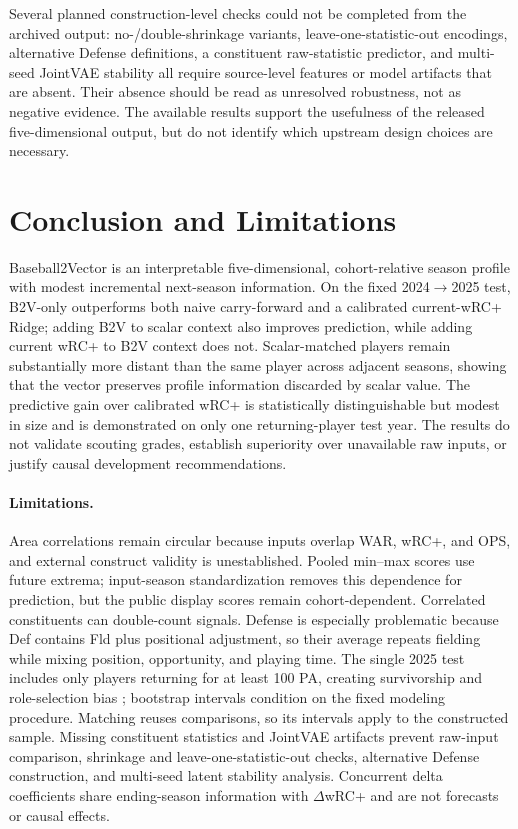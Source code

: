\documentclass[10pt,twocolumn,letterpaper]{article}
\begin{document}
Several planned construction-level checks could not be completed from the archived output: no-/double-shrinkage variants, leave-one-statistic-out encodings, alternative Defense definitions, a constituent raw-statistic predictor, and multi-seed JointVAE stability all require source-level features or model artifacts that are absent. Their absence should be read as unresolved robustness, not as negative evidence. The available results support the usefulness of the released five-dimensional output, but do not identify which upstream design choices are necessary.


\section{Conclusion and Limitations}
\label{sec:conclusion}

Baseball2Vector is an interpretable five-dimensional, cohort-relative season profile with modest incremental next-season information. On the fixed 2024$\to$2025 test, B2V-only outperforms both naive carry-forward and a calibrated current-wRC+ Ridge; adding B2V to scalar context also improves prediction, while adding current wRC+ to B2V context does not. Scalar-matched players remain substantially more distant than the same player across adjacent seasons, showing that the vector preserves profile information discarded by scalar value. The predictive gain over calibrated wRC+ is statistically distinguishable but modest in size and is demonstrated on only one returning-player test year. The results do not validate scouting grades, establish superiority over unavailable raw inputs, or justify causal development recommendations.

\paragraph{Limitations.}
Area correlations remain circular because inputs overlap WAR, wRC+, and OPS, and external construct validity is unestablished. Pooled min--max scores use future extrema; input-season standardization removes this dependence for prediction, but the public display scores remain cohort-dependent. Correlated constituents can double-count signals. Defense is especially problematic because Def contains Fld plus positional adjustment, so their average repeats fielding while mixing position, opportunity, and playing time. The single 2025 test includes only players returning for at least 100 PA, creating survivorship and role-selection bias \cite{nguyen2024}; bootstrap intervals condition on the fixed modeling procedure. Matching reuses comparisons, so its intervals apply to the constructed sample. Missing constituent statistics and JointVAE artifacts prevent raw-input comparison, shrinkage and leave-one-statistic-out checks, alternative Defense construction, and multi-seed latent stability analysis. Concurrent delta coefficients share ending-season information with $\Delta$wRC+ and are not forecasts or causal effects.
\end{document}
